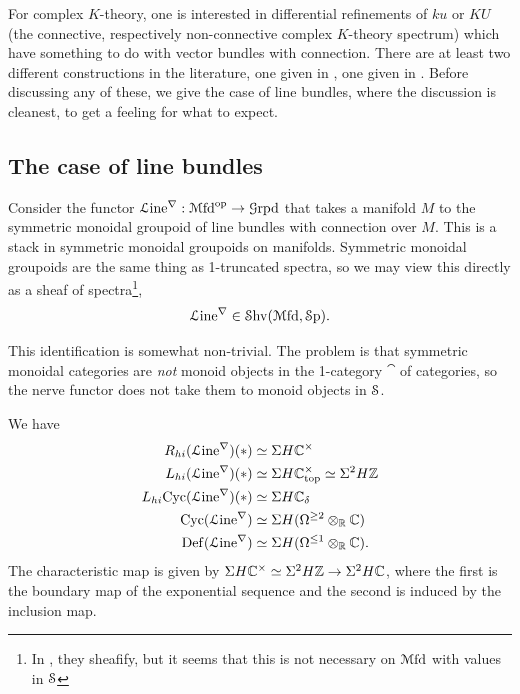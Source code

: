 \documentclass[10pt]{amsart}
\begin{document}
For complex $K$-theory, one is interested in differential refinements of $ku$ or $KU$ (the connective, respectively non-connective complex $K$-theory spectrum) which have something to do with vector bundles with connection. There are at least two different constructions in the literature, one given in \cite{hopkinssinger2005diffcoh}, one given in \cite{bunkenikolausvoelkl2016diffcoh}. Before discussing any of these, we give the case of line bundles, where the discussion is cleanest, to get a feeling for what to expect.

\subsection{The case of line bundles}
Consider the functor $\mathcal{L}\mathrm{ine}^\nabla : \mathcal{M}\mathrm{fd}^{\mathrm{op}} \to \mathcal{G}\mathrm{rpd}$ that takes a manifold $M$ to the symmetric monoidal groupoid of line bundles with connection over $M$. This is a stack in symmetric monoidal groupoids on manifolds. Symmetric monoidal groupoids are the same thing as 1-truncated spectra, so we may view this directly as a sheaf of spectra\footnote{In \cite[Eq.~(39)]{bunkenikolausvoelkl2016diffcoh}, they sheafify, but it seems that this is not necessary on $\mathcal{M}\mathrm{fd}$ with values in $\mathcal{S}$},
\[
\mathcal{L}\mathrm{ine}^\nabla \in \mathcal{S}\mathrm{hv}(\mathcal{M}\mathrm{fd}, \mathcal{S}\mathrm{p}).
\]

\begin{remark}
\label{RemComMon}
This identification is somewhat non-trivial. The problem is that symmetric monoidal categories are \emph{not} monoid objects in the 1-category $\cat$ of categories, so the nerve functor does not take them to monoid objects in $\mathcal{S}$.
\end{remark}

\begin{theorem}
We have
\begin{align*}
R_{hi}(\mathcal{L}\mathrm{ine}^\nabla)(*) 
&\simeq \Sigma H\mathbb{C}^\times
\\
L_{hi}(\mathcal{L}\mathrm{ine}^\nabla)(*) &\simeq \Sigma H\mathbb{C}^\times_{\mathrm{top}} 
\simeq \Sigma^2 H\mathbb{Z}
\\
L_{hi}\mathrm{Cyc}(\mathcal{L}\mathrm{ine}^\nabla)(*) &\simeq \Sigma H\mathbb{C}_\delta
\\
\mathrm{Cyc}(\mathcal{L}\mathrm{ine}^\nabla) &\simeq \Sigma H(\Omega^{\geq 2} \otimes_{\mathbb{R}} \mathbb{C})
\\
\mathrm{Def}(\mathcal{L}\mathrm{ine}^\nabla) &\simeq \Sigma H(\Omega^{\leq 1} \otimes_{\mathbb{R}} \mathbb{C} ).
\end{align*}
The characteristic map is given by $\Sigma H\mathbb{C}^\times \simeq \Sigma^2 H\mathbb{Z} \to \Sigma^2 H \mathbb{C}$, where the first is the boundary map of the exponential sequence and the second is induced by the inclusion map.
\end{theorem}
\end{document}
